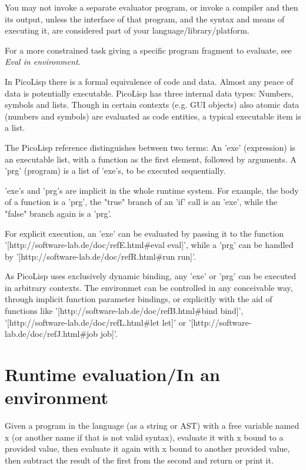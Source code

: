 You may not invoke a separate evaluator program, or invoke a compiler
and then its output, unless the interface of that program, and the
syntax and means of executing it, are considered part of your
language/library/platform.

For a more constrained task giving a specific program fragment to
evaluate, see \emph{Eval in environment}.


\begin{wideverbatim}

In PicoLisp there is a formal equivalence of code and data. Almost any peace of
data is potentially executable. PicoLisp has three internal data types: Numbers,
symbols and lists. Though in certain contexts (e.g. GUI objects) also atomic
data (numbers and symbols) are evaluated as code entities, a typical executable
item is a list.

The PicoLisp reference distinguishes between two terms: An 'exe' (expression) is
an executable list, with a function as the first element, followed by arguments.
A 'prg' (program) is a list of 'exe's, to be executed sequentially.

'exe's and 'prg's are implicit in the whole runtime system. For example, the
body of a function is a 'prg', the "true" branch of an 'if' call is an 'exe',
while the "false" branch again is a 'prg'.

For explicit execution, an 'exe' can be evaluated by passing it to the function
'[http://software-lab.de/doc/refE.html#eval eval]', while a 'prg' can be handled
by '[http://software-lab.de/doc/refR.html#run run]'.

As PicoLisp uses exclusively dynamic binding, any 'exe' or 'prg' can be executed
in arbitrary contexts. The environmet can be controlled in any conceivable way,
through implicit function parameter bindings, or explicitly with the aid of
functions like '[http://software-lab.de/doc/refB.html#bind bind]',
'[http://software-lab.de/doc/refL.html#let let]' or
'[http://software-lab.de/doc/refJ.html#job job]'.

\end{wideverbatim}

\pagebreak{}
\section*{Runtime evaluation/In an environment}

Given a program in the language (as a string or AST) with a free
variable named x (or another name if that is not valid syntax), evaluate
it with x bound to a provided value, then evaluate it again with x bound
to another provided value, then subtract the result of the first from
the second and return or print it.

